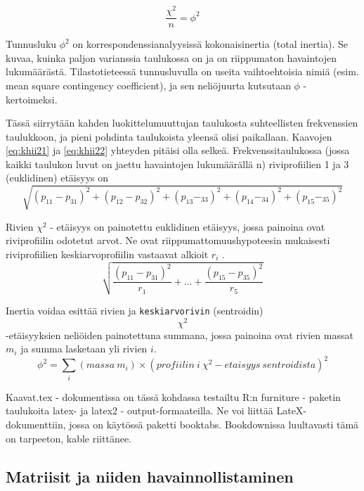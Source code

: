 \documentclass[finnish,]{article}
\begin{document}
\begin{equation}
 \frac{\chi^{2}}{n} = \phi^{2}
  \label{eq:inert1}
 \end{equation}

Tunnusluku \(\phi^{2}\) on korrespondenssianalyysissä kokonaisinertia
(total inertia). Se kuvaa, kuinka paljon varianssia taulukossa on ja on
riippumaton havaintojen lukumäärästä. Tilastotieteessä tunnusluvulla on
useita vaihtoehtoisia nimiä (esim. mean square contingency coefficient),
ja sen neliöjuurta kutsutaan \(\phi\) - kertoimeksi.

Tässä siirrytään kahden luokittelumuuttujan taulukosta suhteellisten
frekvenssien taulukkoon, ja pieni pohdinta taulukoista yleensä olisi
paikallaan. Kaavojen \eqref{eq:khii21} ja \eqref{eq:khii22} yhteyden pitäisi
olla selkeä. Frekvenssitaulukossa (jossa kaikki taulukon luvut on jaettu
havaintojen lukumäärällä n) riviprofiilien 1 ja 3 (euklidinen) etäisyys
on \begin{equation}
 \sqrt{(p_{11} - p_{31})^2 + (p_{12} - p_{32})^2 + (p_{13} - _{33})^2+ (p_{14} - _{34})^2+ (p_{15} - _{35})^2}
 \end{equation}

Rivien \(\chi^{2}\) - etäisyys on painotettu euklidinen etäisyys, jossa
painoina ovat riviprofiilin odotetut arvot. Ne ovat
riippumattomuushypoteesin mukaisesti riviprofiilien keskiarvoprofiilin
vastaavat alkioit \(r_{i}\) . \begin{equation}
 \sqrt{\frac{(p_{11} - p_{31})^2} { r_{1}} + \dots + \frac{(p_{15} - p_{35})^2} {r_{5}}}
\end{equation}

Inertia voidaa esittää rivien ja \texttt{keskiarvorivin} (sentroidin)
\[\chi^{2}\] -etäisyyksien neliöiden painotettuna summana, jossa
painoina ovat rivien massat \(m_{i}\) ja summa lasketaan yli rivien
\({i}\). \begin{equation}
 \phi^{2} = \sum_{i} (massa \: m_{i}) \times (profiilin \: i \: \chi^{2} - etaisyys \: sentroidista)^{2}
\end{equation}

Kaavat.tex - dokumentissa on tässä kohdassa testailtu R:n furniture -
paketin taulukoita latex- ja latex2 - output-formaateilla. Ne voi
liittää LateX-dokumenttiin, jossa on käytössä paketti booktabs.
Bookdownissa luultavasti tämä on tarpeeton, kable riittänee.

\hypertarget{matriisit-ja-niiden-havainnollistaminen}{%
\subsection{Matriisit ja niiden
havainnollistaminen}\label{matriisit-ja-niiden-havainnollistaminen}}
\end{document}
